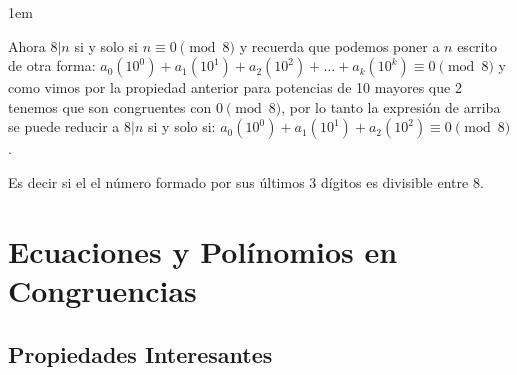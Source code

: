 \documentclass[12pt, fleqn]{report}                             %
\newenvironment{SmallIndentation}[1][0.75em]                    %
    {\begin{adjustwidth}{#1}{}\begin{footnotesize}}                 %
    {\end{footnotesize}\end{adjustwidth}}                           %
\begin{document}
\begin{itemize}
\begin{SmallIndentation}[1em]
                        Ahora $8|n$ si y solo si $n \equiv 0 \pmod{8}$ y recuerda
                        que podemos poner a $n$ escrito de otra forma:
                        $a_0(10^0) + a_1(10^1) + a_2(10^2) + \dots + a_k(10^k) \equiv 0 \pmod{8}$
                        y como vimos por la propiedad anterior para potencias de 10 mayores que
                        2 tenemos que son congruentes con $0 \pmod{8}$, por lo tanto la
                        expresión de arriba se puede reducir a $8|n$ si y solo si: 
                        $a_0(10^0) + a_1(10^1) + a_2(10^2) \equiv 0 \pmod{8}$.

                        Es decir si el el número formado por sus últimos 3 dígitos es divisible
                        entre 8.

                    \end{SmallIndentation}

            \end{itemize}










    \clearpage
    \section{Ecuaciones y Polínomios en Congruencias}


        \subsection{Propiedades Interesantes}
\end{document}

